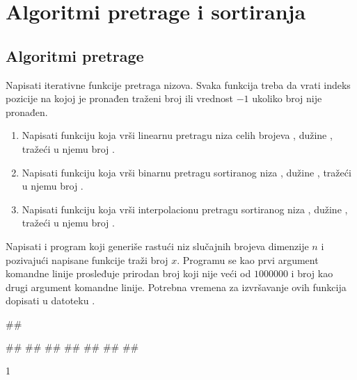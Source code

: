 
\chapter{Algoritmi pretrage i sortiranja}

\section{Algoritmi pretrage}

\begin{Exercise}[label=3_01]
  Napisati iterativne funkcije pretraga nizova. Svaka funkcija treba
  da vrati indeks pozicije na kojoj je pronađen traženi broj ili
  vrednost $-1$ ukoliko broj nije pronađen.
  \begin{enumerate}  
  \item Napisati funkciju  koja vrši linearnu pretragu niza 
    celih brojeva , dužine , tražeći u njemu broj
    .  
  \item Napisati funkciju  koja vrši binarnu pretragu
    sortiranog niza , dužine , tražeći u njemu broj .
  \item Napisati funkciju  koja vrši interpolacionu pretragu
    sortiranog niza , dužine , tražeći u njemu broj .
  \end{enumerate}
  Napisati i program koji generiše rastući niz slučajnih brojeva dimenzije
  $n$ i pozivajući napisane funkcije traži broj $x$. Programu se kao prvi 
  argument komandne linije prosleđuje prirodan broj  koji nije veći od $1000000$ i broj  kao drugi
  argument komandne linije. Potrebna vremena za izvršavanje ovih
  funkcija dopisati u datoteku .

  
\begin{minitest}
\begin{test}{1}
##
  
#\naslovIzlaz#
##
##
##
##
##
##
\end{test}
\end{minitest}
\begin{minitest}
\begin{test2}{1}
    


\end{test2}
\end{minitest}
\end{Exercise}
